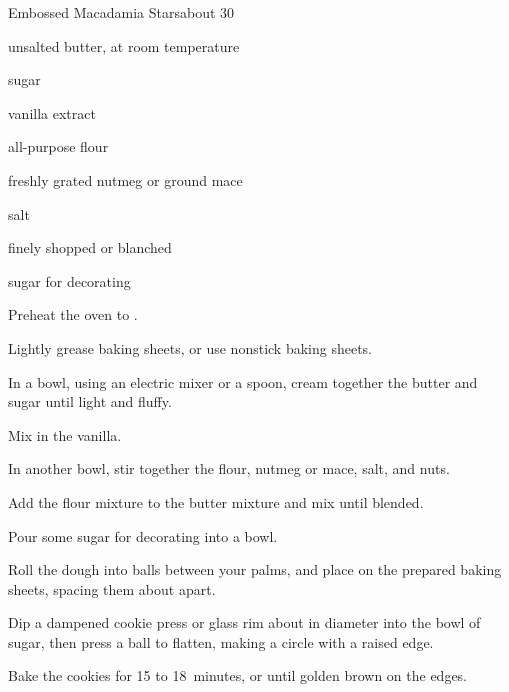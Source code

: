 \begin{recipe}{Embossed Macadamia Stars}{}{about 30}

\begin{ingredients}
\item {} unsalted butter, at room temperature
\item \C{\half} sugar
\item {} vanilla extract
\item {} all-purpose flour
\item \tp{\half} freshly grated nutmeg or ground mace
\item \tp{\eighth} salt
\item \C{\half} finely shopped  or blanched 
\item sugar for decorating
\end{ingredients}

\begin{directions}
\item Preheat the oven to .
\item Lightly grease baking sheets, or use nonstick baking sheets.
\item In a bowl, using an electric mixer or a spoon, cream together the butter and sugar until light and fluffy.
\item Mix in the vanilla.
\item In another bowl, stir together the flour, nutmeg or mace, salt, and nuts.
\item Add the flour mixture to the butter mixture and mix until blended.
\item Pour some sugar for decorating into a bowl.
\item Roll the dough into \inch{\threequarter}  balls between your palms, and place on the prepared baking sheets, spacing them about  apart.
\item Dip a dampened cookie press or glass rim about \inch{2\quarter} in diameter into the bowl of sugar, then press a ball to flatten, making a circle with a raised edge.
\item Bake the cookies for 15 to 18~minutes, or until golden brown on the edges.
\end{directions}


\end{recipe}
